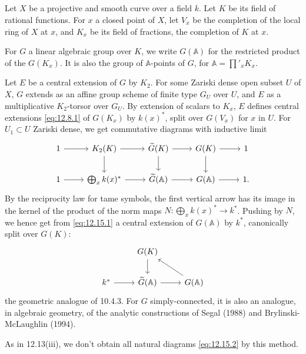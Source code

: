 \documentclass[11pt,a4paper]{article}
\theoremstyle{plain}
\theoremstyle{definition}
\newcommand{\bA}{\mathbb{A}}
\begin{document}
\subsection{}
Let $X$ be a projective and smooth curve over a field $k$. Let $K$ be its field of rational functions. For $x$ a closed point of $X$, let $V_x$ be the completion of the local ring of $X$ at $x$, and $K_x$ be its field of fractions, the completion of $K$ at $x$.

For $G$ a linear algebraic group over $K$, we write $G(\bA)$ for the restricted product of the $G(K_x)$. It is also the group of $\bA$-points of $G$, for $\bA = \prod'_x K_x$.

Let $E$ be a central extension of $G$ by $K_2$. For some Zariski dense open subset $U$ of $X$, $G$ extends as an affine group scheme of finite type $G_U$ over $U$, and $E$ as a multiplicative $K_2$-torsor over $G_U$. By extension of scalars to $K_x$, $E$ defines central extensions \eqref{eq:12.8.1} of $G(K_x)$ by $k(x)^*$, split over $G(V_x)$ for $x$ in $U$. For $U_1 \subset U$ Zariski dense, we get commutative diagrams with inductive limit
\begin{equation}\label{eq:12.15.1}
\begin{tikzcd}
1 \arrow[r] & K_2(K) \arrow[r] \arrow[d] & \widetilde{G}(K) \arrow[r] \arrow[d] & G(K) \arrow[r] \arrow[d] & 1 \\
1 \arrow[r] & \bigoplus_x k(x)^* \arrow[r] & \widetilde{G}(\bA) \arrow[r] & G(\bA) \arrow[r] & 1.
\end{tikzcd}
\end{equation}
By the reciprocity law for tame symbols, the first vertical arrow has its image in the kernel of the product of the norm maps $N: \bigoplus_x k(x)^* \to k^*$. Pushing by $N$, we hence get from \eqref{eq:12.15.1} a central extension of $G(\bA)$ by $k^*$, canonically split over $G(K)$:
\begin{equation}\label{eq:12.15.2}
\begin{tikzcd}
& G(K) \arrow[d] \\
k^* \arrow[r] & \widetilde{G}(\bA) \arrow[r] & G(\bA) \arrow[lu]
\end{tikzcd}
\end{equation}
the geometric analogue of 10.4.3. For $G$ simply-connected, it is also an analogue, in algebraic geometry, of the analytic constructions of Segal (1988) and Brylinski-McLaughlin (1994).

As in 12.13(iii), we don't obtain all natural diagrams \eqref{eq:12.15.2} by this method.
\end{document}
